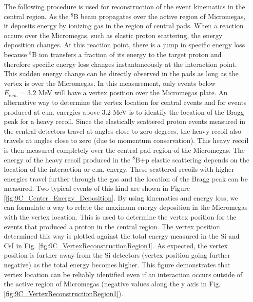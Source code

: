 \documentclass[final,number,sort&compress,5p,times,twocolumn]{elsarticle}
\begin{document}
The following procedure is used for reconstruction of the event kinematics in the central region.
As the $^{8}$B beam propagates over the active region of Micromegas, it deposits energy by ionizing gas in the region of central pads. When a reaction occurs over the Micromegas, such as elastic proton scattering, the energy deposition changes. At this reaction point, there is a jump in specific energy loss because $^{8}$B ion transfers a fraction of its energy to the target proton and therefore specific energy loss changes instantaneously at the interaction point. This sudden energy change can be directly observed in the pads as long as the vertex is over the Micromegas. In this measurement, only events below $E_{c.m.} = 3.2$ MeV will have a vertex position over the Micromegas plate. An alternative way to determine the vertex location for central events and for events produced at c.m. energies above $3.2$ MeV is to identify the location of the Bragg peak for a heavy recoil. Since the elastically scattered proton events measured in the central detectors travel at angles close to zero degrees, the heavy recoil also travels at angles close to zero (due to momentum conservation). This heavy recoil is then measured completely over the central pad region of the Micromegas. The energy of the heavy recoil produced in the $^8$B+p elastic scattering depends on the location of the interaction or c.m. energy. These scattered recoils with higher energies travel further through the gas and the location of the Bragg peak can be measured. Two typical events of this kind are shown in Figure \ref{fig:9C_Center_Energy_Deposition}. By using kinematics and energy loss, we can formulate a way to relate the maximum energy deposition in the Micromegas with the vertex location. This is used to determine the vertex position for the events that produced a proton in the central region. The vertex position determined this way is plotted against the total energy measured in the Si and CsI in Fig. \ref{fig:9C_VertexReconstructionRegion1}. As expected, the vertex position is further away from the Si detectors (vertex position going further negative) as the total energy becomes higher. This figure demonstrates that vertex location can be reliably identified even if an interaction occurs outside of the active region of Micromegas (negative values along the y axis in Fig. \ref{fig:9C_VertexReconstructionRegion1}).
\end{document}
